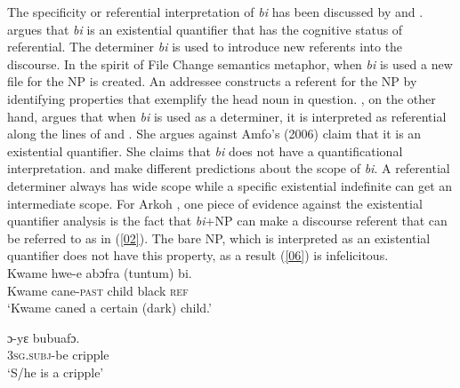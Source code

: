 \documentclass[output=paper,modfonts,nonflat,draftmode]{langsci/langscibook}
\begin{document}
The specificity or referential interpretation of \emph{bi} has been discussed by \citet{Amfo2009} and \citet{Arkoh2011}. \citet{Amfo2009} argues that \emph{bi} is an existential quantifier that has the cognitive status of referential. The determiner \emph{bi} is used to introduce new referents into the discourse. In the spirit of  File Change semantics metaphor, when \emph{bi} is used a new file for the NP is created. An addressee constructs a referent for the NP by identifying properties that exemplify the head noun in question. \citet{Arkoh2011}, on the other hand, argues that when \emph{bi} is used as a determiner, it is interpreted as referential along the lines of \citet{FodorSag1982} and \citet{Kratzer1998}. She argues against Amfo's (2006) claim that it is an existential quantifier. She claims that \emph{bi} does not have a quantificational interpretation. \citet{Amfo2009} and \citet{Arkoh2011} make different predictions about the scope of \emph{bi}. A referential determiner always has wide scope while a specific existential indefinite can get an intermediate scope. For Arkoh \cite{Arkoh2011}, one piece of evidence against the existential quantifier analysis is the fact that \emph{bi}+NP can make a discourse referent that can be referred to as in (\ref{02}). The bare NP, which is interpreted as an existential quantifier does not have this property, as a result (\ref{06}) is infelicitous.    
\ea
{}\\
\ea\label{01} 
\gll Kwame  hwe-e  abɔfra (tuntum) bi.\\
 Kwame cane-\textsc{past} child black \textsc{ref}\\
 
\glt ‘Kwame caned a certain (dark) child.'

\ex\label{02}
\gll ɔ-yε bubuafɔ.\\
\textsc{3sg.subj}-be cripple\\
 
\glt ‘S/he is a cripple’
\z \z

\ea
{}\\

\z \z 
\end{document}
